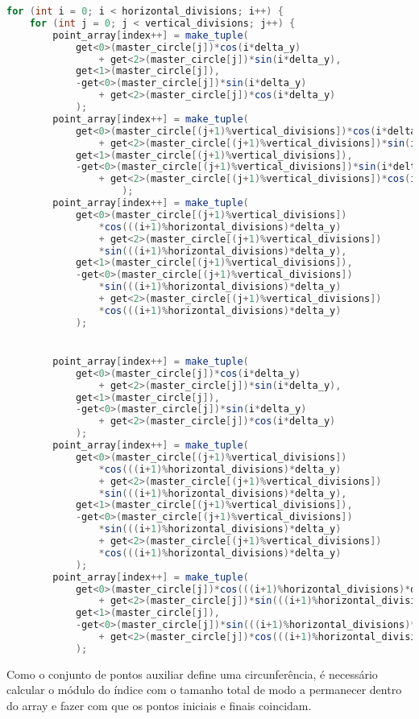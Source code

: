 \documentclass[14pt, a4 paper]{report}
\begin{document}
\begin{lstlisting}[language = Java]
for (int i = 0; i < horizontal_divisions; i++) {
    for (int j = 0; j < vertical_divisions; j++) {
        point_array[index++] = make_tuple(
            get<0>(master_circle[j])*cos(i*delta_y) 
                + get<2>(master_circle[j])*sin(i*delta_y),
            get<1>(master_circle[j]),
            -get<0>(master_circle[j])*sin(i*delta_y) 
                + get<2>(master_circle[j])*cos(i*delta_y)
            );
        point_array[index++] = make_tuple(
            get<0>(master_circle[(j+1)%vertical_divisions])*cos(i*delta_y) 
                + get<2>(master_circle[(j+1)%vertical_divisions])*sin(i*delta_y),
            get<1>(master_circle[(j+1)%vertical_divisions]),
            -get<0>(master_circle[(j+1)%vertical_divisions])*sin(i*delta_y) 
                + get<2>(master_circle[(j+1)%vertical_divisions])*cos(i*delta_y)
                    );
        point_array[index++] = make_tuple(
            get<0>(master_circle[(j+1)%vertical_divisions])               
                *cos(((i+1)%horizontal_divisions)*delta_y) 
                + get<2>(master_circle[(j+1)%vertical_divisions])
                *sin(((i+1)%horizontal_divisions)*delta_y),
            get<1>(master_circle[(j+1)%vertical_divisions]),
            -get<0>(master_circle[(j+1)%vertical_divisions])
                *sin(((i+1)%horizontal_divisions)*delta_y) 
                + get<2>(master_circle[(j+1)%vertical_divisions])
                *cos(((i+1)%horizontal_divisions)*delta_y)
            );


        point_array[index++] = make_tuple(
            get<0>(master_circle[j])*cos(i*delta_y) 
                + get<2>(master_circle[j])*sin(i*delta_y),
            get<1>(master_circle[j]),
            -get<0>(master_circle[j])*sin(i*delta_y) 
                + get<2>(master_circle[j])*cos(i*delta_y)
            );
        point_array[index++] = make_tuple(
            get<0>(master_circle[(j+1)%vertical_divisions])
                *cos(((i+1)%horizontal_divisions)*delta_y) 
                + get<2>(master_circle[(j+1)%vertical_divisions])
                *sin(((i+1)%horizontal_divisions)*delta_y),
            get<1>(master_circle[(j+1)%vertical_divisions]),
            -get<0>(master_circle[(j+1)%vertical_divisions])
                *sin(((i+1)%horizontal_divisions)*delta_y) 
                + get<2>(master_circle[(j+1)%vertical_divisions])
                *cos(((i+1)%horizontal_divisions)*delta_y)
            );
        point_array[index++] = make_tuple(
            get<0>(master_circle[j])*cos(((i+1)%horizontal_divisions)*delta_y) 
                + get<2>(master_circle[j])*sin(((i+1)%horizontal_divisions)*delta_y),
            get<1>(master_circle[j]),
            -get<0>(master_circle[j])*sin(((i+1)%horizontal_divisions)*delta_y) 
                + get<2>(master_circle[j])*cos(((i+1)%horizontal_divisions)*delta_y)
            );
\end{lstlisting}
Como o conjunto de pontos auxiliar define uma circunferência, é necessário calcular o módulo do índice com o tamanho total de modo a permanecer dentro do array e fazer com que os pontos iniciais e finais coincidam.
\end{document}
